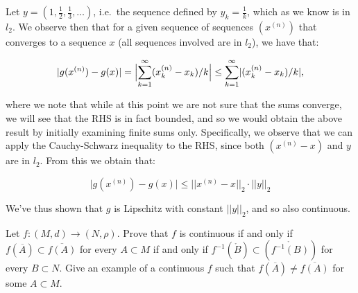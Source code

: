 \begin{solution}
    
    Let $y = (1, \frac{1}{2}, \frac{1}{3}, \ldots)$, i.e.\ the sequence defined by $y_k = \frac{1}{k}$, which as we know is in $l_2$.
    We observe then that for a given sequence of sequences $(x^{(n)})$ that converges to a sequence $x$ (all sequences involved are in $l_2$), we have that:

    \[ \lvert g(x^{(n)}) - g(x) \rvert = \Bigl\lvert \sum_{k=1}^{\infty} (x_k^{(n)} - x_k)/k \Bigr\rvert \leq \sum_{k=1}^{\infty} \lvert (x_k^{(n)} -x_k)/k \rvert,\]

    where we note that while at this point we are not sure that the sums converge, we will see that the RHS is in fact bounded, and so we would obtain the above result by initially examining finite sums only.
    Specifically, we observe that we can apply the Cauchy-Schwarz inequality to the RHS, since both $(x^{(n)} - x)$ and $y$ are in $l_2$.
    From this we obtain that:

    \[\lvert g(x^{(n)}) - g(x) \rvert \leq \lvert \lvert x^{(n)} - x \rvert \rvert _2 \cdot \lvert \lvert y \rvert \rvert _2\]

    We've thus shown that $g$ is Lipschitz with constant $\lvert \lvert y \rvert \rvert _2$, and so also continuous.

\end{solution}

\begin{exercise}{30}
    Let $f: (M, d) \rightarrow (N, \rho)$.
    Prove that $f$ is continuous if and only if $f(\overline{A}) \subset \overline{f(A)}$ for every $A \subset M$ if and only if $f^{-1}(\mathring{B}) \subset (\mathring{f^{-1}(B)})$ for every $B \subset N$.
    Give an example of a continuous $f$ such that $f(\overline{A}) \neq \overline{f(A)}$ for some $A \subset M$.
\end{exercise}

